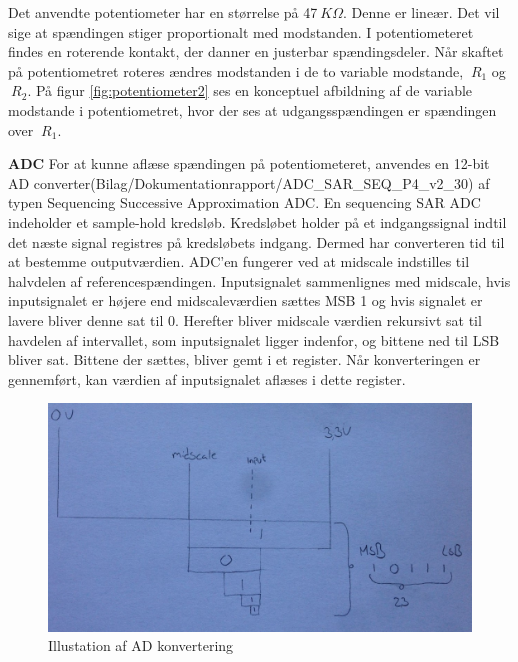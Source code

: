 \noindent Det anvendte potentiometer har en størrelse på 47\(\ K\Omega\). Denne er lineær. Det vil sige at spændingen stiger proportionalt med modstanden. I potentiometeret findes en roterende kontakt, der danner en justerbar spændingsdeler. Når skaftet på potentiometret roteres ændres modstanden i de to variable modstande, \(\ R_{1}\) og  \(\ R_{2}\). På figur \ref{fig:potentiometer2} ses en konceptuel afbildning af de variable modstande i potentiometret, hvor der ses at udgangsspændingen er spændingen over \(\ R_{1}\). \newline

\noindent \textbf{ADC} \newline
For at kunne aflæse spændingen på potentiometeret, anvendes en 12-bit AD converter(Bilag/Dokumentationrapport/ADC\_SAR\_SEQ\_P4\_v2\_30) af typen Sequencing Successive Approximation ADC. En sequencing SAR ADC indeholder et sample-hold kredsløb. Kredsløbet holder på et indgangssignal indtil det næste signal registres på kredsløbets indgang. Dermed har converteren tid til at bestemme outputværdien. \newline \newline
\noindent ADC'en fungerer ved at midscale indstilles til halvdelen af referencespændingen. Inputsignalet sammenlignes med midscale, hvis inputsignalet er højere end midscaleværdien sættes MSB 1 og hvis signalet er lavere bliver denne sat til 0. Herefter bliver midscale værdien rekursivt sat til havdelen af intervallet, som inputsignalet ligger indenfor, og bittene ned til LSB bliver sat. Bittene der sættes, bliver gemt i et register. Når konverteringen er gennemført, kan værdien af inputsignalet aflæses i dette register. 

\begin{figure}[H]
	\centering
	\includegraphics[width=\textwidth]{DesignOgImplementering/images/ADC}
	\caption{Illustation af AD konvertering}
	\label{fig:ADC1}
	
\end{figure}

